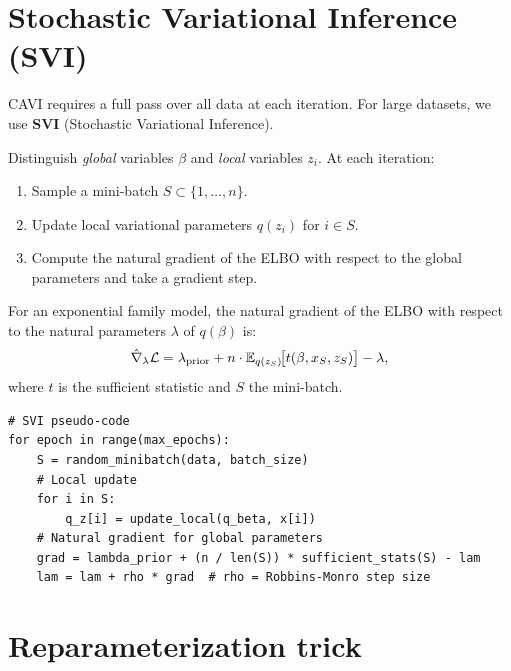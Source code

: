 \section{Stochastic Variational Inference (SVI)}

CAVI requires a full pass over all data at each iteration. For large
datasets, we use \textbf{SVI} (Stochastic Variational Inference).

\begin{definition}[SVI]
Distinguish \emph{global} variables $\beta$ and \emph{local} variables $z_i$.
At each iteration:
\begin{enumerate}
  \item Sample a mini-batch $S \subset \{1, \ldots, n\}$.
  \item Update local variational parameters $q(z_i)$ for $i \in S$.
  \item Compute the natural gradient of the ELBO with respect to the
        global parameters and take a gradient step.
\end{enumerate}
\end{definition}

\begin{proposition}
For an exponential family model, the natural gradient of the ELBO with
respect to the natural parameters $\lambda$ of $q(\beta)$ is:
\[
  \hat{\nabla}_\lambda \mathcal{L} = \lambda_{\mathrm{prior}} + n \cdot
  \mathbb{E}_{q(z_S)}\!\bigl[t(\beta, x_S, z_S)\bigr] - \lambda,
\]
where $t$ is the sufficient statistic and $S$ the mini-batch.
\end{proposition}

\begin{verbatim}
# SVI pseudo-code
for epoch in range(max_epochs):
    S = random_minibatch(data, batch_size)
    # Local update
    for i in S:
        q_z[i] = update_local(q_beta, x[i])
    # Natural gradient for global parameters
    grad = lambda_prior + (n / len(S)) * sufficient_stats(S) - lam
    lam = lam + rho * grad  # rho = Robbins-Monro step size
\end{verbatim}

\section{Reparameterization trick}

